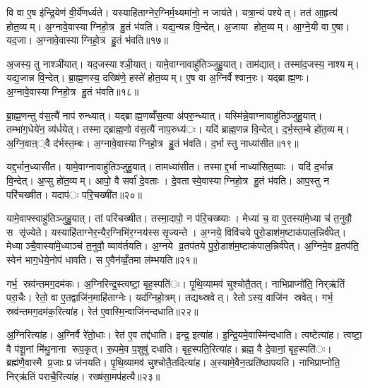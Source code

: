 
वि वा ए॒ष इ॑न्द्रि॒येण॑ वी॒र्ये॑णर्ध्यते। यस्याहि॑ताग्नेर॒ग्निर्म॒थ्यमा॑नो॒ न जाय॑ते। यत्रा॒न्यं पश्येत्। तत॑ आ॒हृत्य॑ होत॒व्यम्। अ॒ग्नावे॒वास्याग्निहो॒त्र हु॒तं भ॑वति। यद्य॒न्यन्न वि॒न्देत्। अ॒जाया होत॒व्यम्। आ॒ग्ने॒यी वा ए॒षा। यद॒जा। अ॒ग्नावे॒वास्याग्निहो॒त्र हु॒तं भ॑वति॥१७॥

अ॒जस्य॒ तु नाश्ञी॑यात्। यद॒जस्याश्ञी॒यात्। यामे॒वाग्नावाहु॑तिञ्जुहु॒यात्। ताम॑द्यात्। तस्मा॑द॒जस्य॒ नाश्यम्। यद्य॒जान्न वि॒न्देत्। ब्रा॒ह्म॒णस्य॒ दख्षि॑णे॒ हस्ते॑ होत॒व्यम्। ए॒ष वा अ॒ग्निर्वैश्वान॒रः। यद्ब्राह्म॒णः। अ॒ग्नावे॒वास्याग्निहो॒त्र हु॒तं भ॑वति॥१८॥

ब्रा॒ह्म॒णन्तु व॑स॒त्यै॑ नाप॑ रुन्ध्यात्। यद्ब्राह्म॒णव्वँ॑स॒त्या अ॑परु॒न्ध्यात्। यस्मि॑न्ने॒वाग्नावाहु॑तिञ्जुहु॒यात्। तम्भा॑ग॒धेये॑न॒ व्य॑र्धयेत्। तस्माद्ब्राह्म॒णो व॑स॒त्यै॑ नाप॒रुध्य॑ः। यदि॑ ब्राह्म॒णन्न वि॒न्देत्। द॒र्भ॒स्त॒म्बे हो॑त॒व्यम्। अ॒ग्नि॒वाऩ््वै द॑र्भस्त॒म्बः। अ॒ग्नावे॒वास्याग्निहो॒त्र हु॒तं भ॑वति। द॒र्भास्तु नाध्या॑सीत॥१९॥

यद्द॒र्भान॒ध्यासी॑त। यामे॒वाग्नावाहु॑तिञ्जुहु॒यात्। तामध्या॑सीत। तस्माद्द॒र्भा नाध्या॑सित॒व्याः। यदि॑ द॒र्भान्न वि॒न्देत्। अ॒प्सु हो॑त॒व्यम्। आपो॒ वै सर्वा॑ दे॒वताः। दे॒वतास्वे॒वास्याग्निहो॒त्र हु॒तं भ॑वति। आप॒स्तु न परि॑चख्षीत। यदाप॑ः परि॒चख्षी॑त॥२०॥

यामे॒वाफ्स्वाहु॑तिञ्जुहु॒यात्। तां परि॑चख्षीत। तस्मा॒दापो॒ न प॑रि॒चख्ष्याः। मेध्या॑ च॒ वा ए॒तस्या॑मे॒ध्या च॑ त॒नुवौ॒ स सृ॑ज्येते। यस्याहि॑ताग्नेर॒न्यैर॒ग्निभि॑र॒ग्नय॑स्ससृ॒ज्यन्ते। अ॒ग्नये॒ विवि॑चये पुरो॒डाश॑म॒ष्टाक॑पाल॒न्निर्व॑पेत्। मेध्याञ्चै॒वास्या॑मे॒ध्याञ्च॑ त॒नुवौ॒ व्याव॑र्तयति। अ॒ग्नये व्र॒तप॑तये पु॒रो॒डाश॑म॒ष्टाक॑पाल॒न्निर्व॑पेत्। अ॒ग्निमे॒व व्र॒तप॑ति॒ स्वेन॑ भाग॒धेये॒नोप॑ धावति। स ए॒वैन॑व्व्रँ॒तमा ल॑म्भयति॥२१॥

गर्भ॒ स्रव॑न्तमग॒दम॑कः। अ॒ग्निरिन्द्र॒स्त्वष्टा॒ बृह॒स्पति॑ः। पृ॒थि॒व्यामव॑ चुश्चोतै॒तत्। नाभिप्राप्नो॑ति॒ निर्‌ऋ॑तिं परा॒चैः। रेतो॒ वा ए॒तद्वाजि॑न॒माहि॑ताग्नेः। यद॑ग्निहो॒त्रम्। तद्यथ्स्रवेत्। रेतोऽस्य॒ वाजि॑न स्रवेत्। गर्भ॒ स्रव॑न्तमग॒दम॑क॒रित्या॑ह। रेत॑ ए॒वास्मि॒न्वाजि॑नन्दधाति॥२२॥

अ॒ग्निरित्या॑ह। अ॒ग्निर्वै रे॑तो॒धाः। रेत॑ ए॒व तद्द॑धाति। इन्द्र॒ इत्या॑ह। इ॒न्द्रि॒यमे॒वास्मि॑न्दधाति। त्वष्टेत्या॑ह। त्वष्टा॒ वै प॑शू॒नां मि॑थु॒नाना रूप॒कृत्। रू॒पमे॒व प॒शुषु॑ दधाति। बृह॒स्पति॒रित्या॑ह। ब्रह्म॒ वै दे॒वानां॒ बृह॒स्पति॑ः। ब्रह्म॑णै॒वास्मै प्र॒जाः प्र ज॑नयति। पृ॒थि॒व्यामव॑ चुश्चोतै॒तदित्या॑ह। अ॒स्यामे॒वैन॒त्प्रति॑ष्ठापयति। नाभिप्राप्नो॑ति॒ निर्‌ऋ॑तिं पराचै॒रित्या॑ह। रख्ष॑सा॒मप॑हत्यै॥२३॥

